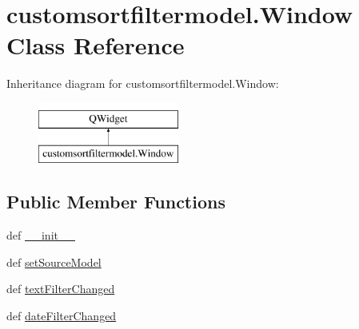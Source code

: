 \hypertarget{classcustomsortfiltermodel_1_1Window}{}\section{customsortfiltermodel.\+Window Class Reference}
\label{classcustomsortfiltermodel_1_1Window}
Inheritance diagram for customsortfiltermodel.\+Window\+:\begin{figure}[H]
\begin{center}
\leavevmode
\includegraphics[height=2.000000cm]{classcustomsortfiltermodel_1_1Window}
\end{center}
\end{figure}
\subsection*{Public Member Functions}
\begin{DoxyCompactItemize}
\item 
def \hyperlink{classcustomsortfiltermodel_1_1Window_a72cffa6605d56db4c87f0f4a6437f185}{\+\_\+\+\_\+init\+\_\+\+\_\+}
\item 
def \hyperlink{classcustomsortfiltermodel_1_1Window_abf874860a9f3a3293d880eb03221d0a5}{set\+Source\+Model}
\item 
def \hyperlink{classcustomsortfiltermodel_1_1Window_a5ac2f6fd81388c9ccbc7a5e1e2b52cce}{text\+Filter\+Changed}
\item 
def \hyperlink{classcustomsortfiltermodel_1_1Window_ad7ad1b2cff4e28274c46842b921f915f}{date\+Filter\+Changed}
\end{DoxyCompactItemize}
